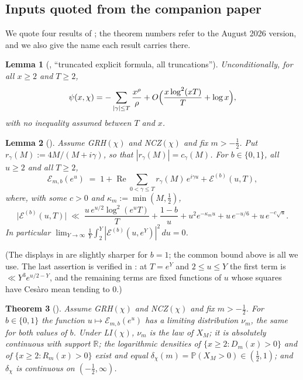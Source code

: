\documentclass[11pt]{amsart}
\newtheorem{theorem}{Theorem}[section]
\newtheorem{lemma}[theorem]{Lemma}
\theoremstyle{definition}
\numberwithin{equation}{section}
\newcommand{\PP}{\mathbb P}
\newcommand{\cE}{\mathcal E}
\newcommand{\re}{\operatorname{Re}}
\begin{document}
\subsection{Inputs quoted from the companion paper}
We quote four results of \cite{WR}; the theorem numbers refer to the
August 2026 version, and we also give the name each result carries
there.

\begin{lemma}[{\cite[Lemma~1]{WR}, ``truncated explicit formula, all
truncations''}]\label{lem:WRclassical}
Unconditionally, for all $x\ge2$ and $T\ge2$,
\[
\psi(x,\chi)=-\sum_{|\gamma|\le T}\frac{x^\rho}{\rho}
+O\Bigl(\frac{x\log^2(xT)}{T}+\log x\Bigr),
\]
with no inequality assumed between $T$ and $x$.
\end{lemma}

\begin{lemma}[{\cite[proofs of Theorem~1(i) and of
Proposition~1]{WR}}]\label{lem:WRexp}
Assume GRH$(\chi)$ and NCZ$(\chi)$ and fix $m>-\tfrac12$. Put
$r_\gamma(M):=4M/(M+i\gamma)$, so that $|r_\gamma(M)|=c_\gamma(M)$.
For $b\in\{0,1\}$, all $u\ge2$ and all $T\ge2$,
\[
\cE_{m,b}(e^u)\;=\;1+\re\sum_{0<\gamma\le T}r_\gamma(M)\,e^{i\gamma u}
+\cE^{(b)}(u,T),
\]
where, with some $c>0$ and $\kappa_m:=\min(M,\tfrac12)$,
\[
\bigl|\cE^{(b)}(u,T)\bigr|\;\ll\;
\frac{u\,e^{u/2}\log^2(e^uT)}{T}+\frac{1-b}{u}+u^2e^{-\kappa_mu}
+u\,e^{-u/6}+u\,e^{-c\sqrt u}.
\]
In particular
$\lim_{Y\to\infty}\frac1Y\int_2^Y|\cE^{(b)}(u,e^Y)|^2\,du=0$.
\end{lemma}

(The displays in \cite{WR} are slightly sharper for $b=1$; the common
bound above is all we use. The last assertion is verified in
\cite{WR}: at $T=e^Y$ and $2\le u\le Y$ the first term is
$\ll Y^3e^{u/2-Y}$, and the remaining terms are fixed functions of $u$
whose squares have Ces\`aro mean tending to $0$.)

\begin{theorem}[{\cite[Theorem~1 and Proposition~1]{WR}}]
\label{thm:WRinterp}
Assume GRH$(\chi)$ and NCZ$(\chi)$ and fix $m>-\tfrac12$. For
$b\in\{0,1\}$ the function $u\mapsto\cE_{m,b}(e^u)$ has a limiting
distribution $\nu_m$, the same for both values of $b$. Under
LI$(\chi)$, $\nu_m$ is the law of $X_M$; it is absolutely continuous
with support $\mathbb R$; the logarithmic densities of
$\{x\ge2:D_m(x)>0\}$ and of $\{x\ge2:R_m(x)>0\}$ exist and equal
$\delta_\chi(m)=\PP(X_M>0)\in(\tfrac12,1)$; and $\delta_\chi$ is
continuous on $(-\tfrac12,\infty)$.
\end{theorem}
\end{document}
